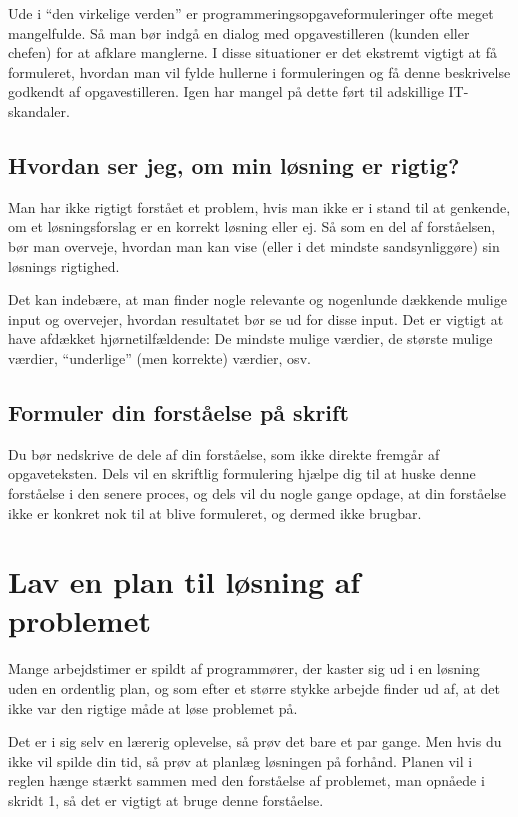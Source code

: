 \documentclass[a4paper,12pt]{article}
\begin{document}
Ude i ``den virkelige verden'' er programmeringsopgaveformuleringer
ofte meget mangelfulde.  Så man bør indgå en dialog med
opgavestilleren (kunden eller chefen) for at afklare manglerne.  I
disse situationer er det ekstremt vigtigt at få formuleret, hvordan
man vil fylde hullerne i formuleringen og få denne beskrivelse
godkendt af opgavestilleren.  Igen har mangel på dette ført til
adskillige IT-skandaler.

\subsection*{Hvordan ser jeg, om min løsning er rigtig?}

Man har ikke rigtigt forstået et problem, hvis man ikke er i stand til
at genkende, om et løsningsforslag er en korrekt løsning eller ej.  Så
som en del af forståelsen, bør man overveje, hvordan man kan vise
(eller i det mindste sandsynliggøre) sin løsnings rigtighed.

Det kan indebære, at man finder nogle relevante og nogenlunde dækkende
mulige input og overvejer, hvordan resultatet bør se ud for disse
input.  Det er vigtigt at have afdækket hjørnetilfældende: De mindste
mulige værdier, de største mulige værdier, ``underlige'' (men
korrekte) værdier, osv.

\subsection*{Formuler din forståelse på skrift}

Du bør nedskrive de dele af din forståelse, som ikke direkte fremgår
af opgaveteksten.  Dels vil en skriftlig formulering hjælpe dig til at
huske denne forståelse i den senere proces, og dels vil du nogle gange
opdage, at din forståelse ikke er konkret nok til at blive formuleret,
og dermed ikke brugbar.

\section{Lav en plan til løsning af problemet}

Mange arbejdstimer er spildt af programmører, der kaster sig ud i en
løsning uden en ordentlig plan, og som efter et større stykke arbejde
finder ud af, at det ikke var den rigtige måde at løse problemet på.

Det er i sig selv en lærerig oplevelse, så prøv det bare et par gange.
Men hvis du ikke vil spilde din tid, så prøv at planlæg løsningen på
forhånd.  Planen vil i reglen hænge stærkt sammen med den forståelse
af problemet, man opnåede i skridt 1, så det er vigtigt at bruge denne
forståelse.
\end{document}
